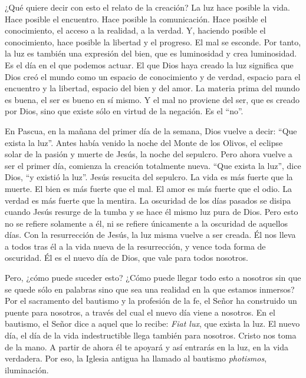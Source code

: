 			\begin{body}¿Qué quiere decir con esto el relato de la creación? La luz hace posible la vida. Hace posible el encuentro. Hace posible la comunicación. Hace posible el conocimiento, el acceso a la realidad, a la verdad. Y, haciendo posible el conocimiento, hace posible la libertad y el progreso. El mal se esconde. Por tanto, la luz es también una expresión del bien, que es luminosidad y crea luminosidad. Es el día en el que podemos actuar. El que Dios haya creado la luz significa que Dios creó el mundo como un espacio de conocimiento y de verdad, espacio para el encuentro y la libertad, espacio del bien y del amor. La materia prima del mundo es buena, el ser es bueno en sí mismo. Y el mal no proviene del ser, que es creado por Dios, sino que existe sólo en virtud de la negación. Es el “no”.\end{body}
			
			\begin{body}En Pascua, en la mañana del primer día de la semana, Dios vuelve a decir: “Que exista la luz”. Antes había venido la noche del Monte de los Olivos, el eclipse solar de la pasión y muerte de Jesús, la noche del sepulcro. Pero ahora vuelve a ser el primer día, comienza la creación totalmente nueva. “Que exista la luz”, dice Dios, “y existió la luz”. Jesús resucita del sepulcro. La vida es más fuerte que la muerte. El bien es más fuerte que el mal. El amor es más fuerte que el odio. La verdad es más fuerte que la mentira. La oscuridad de los días pasados se disipa cuando Jesús resurge de la tumba y se hace él mismo luz pura de Dios. Pero esto no se refiere solamente a él, ni se refiere únicamente a la oscuridad de aquellos días. Con la resurrección de Jesús, la luz misma vuelve a ser creada. Él nos lleva a todos tras él a la vida nueva de la resurrección, y vence toda forma de oscuridad. Él es el nuevo día de Dios, que vale para todos nosotros.\end{body}
			
			\begin{body}Pero, ¿cómo puede suceder esto? ¿Cómo puede llegar todo esto a nosotros sin que se quede sólo en palabras sino que sea una realidad en la que estamos inmersos? Por el sacramento del bautismo y la profesión de la fe, el Señor ha construido un puente para nosotros, a través del cual el nuevo día viene a nosotros. En el bautismo, el Señor dice a aquel que lo recibe: \textit{Fiat lux}, que exista la luz. El nuevo día, el día de la vida indestructible llega también para nosotros. Cristo nos toma de la mano. A partir de ahora él te apoyará y así entrarás en la luz, en la vida verdadera. Por eso, la Iglesia antigua ha llamado al bautismo \textit{photismos}, iluminación.\end{body}
			

